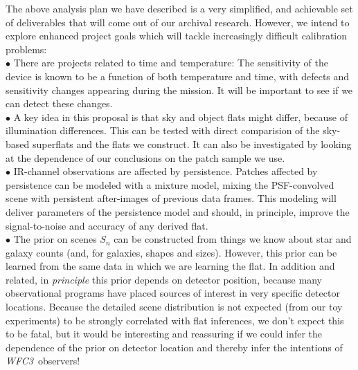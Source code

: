 \documentclass[12pt]{article}
\newcommand{\project}[1]{\textsl{#1}}
\newcommand{\WFC}{\project{WFC3}}
\begin{document}
The above analysis plan we have described is a very simplified, and
achievable set of deliverables that will come out of our archival
research.  However, we intend to explore enhanced project goals which
will tackle increasingly difficult calibration problems:
\\ $\bullet$
There are projects related to time and temperature: The sensitivity
of the device is known to be a function of both temperature and time,
with defects and sensitivity changes appearing during the mission.  It
will be important to see if we can detect these changes.
\\ $\bullet$
A key idea in this proposal is that sky and object flats might differ,
because of illumination differences.  This can be tested with direct
comparision of the sky-based superflats and the flats we construct.
It can also be investigated by looking at the dependence of our
conclusions on the patch sample we use.
\\ $\bullet$
IR-channel observations are affected by persistence.  Patches affected
by persistence can be modeled with a mixture model, mixing the
PSF-convolved scene with persistent after-images of previous data
frames.  This modeling will deliver parameters of the persistence
model and should, in principle, improve the signal-to-noise and
accuracy of any derived flat.
\\ $\bullet$
The prior on scenes $S_n$ can be constructed from things we know about
star and galaxy counts (and, for galaxies, shapes and sizes).
However, this prior can be learned from the same data in which we are
learning the flat.  In addition and related, in \emph{principle} this
prior depends on detector position, because many observational
programs have placed sources of interest in very specific detector
locations.  Because the detailed scene distribution is not expected
(from our toy experiments) to be strongly correlated with flat
inferences, we don't expect this to be fatal, but it would be
interesting and reassuring if we could infer the dependence of the
prior on detector location and thereby infer the intentions of
\WFC\ observers!

%
%
\budgetnarrative       %
\end{document}
